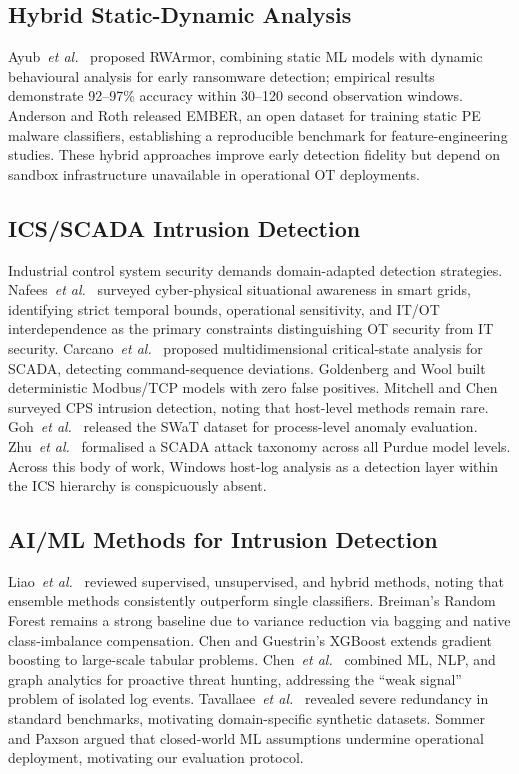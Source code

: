 \subsection{Hybrid Static-Dynamic Analysis}

Ayub~\textit{et al.}\ \cite{ayub2023} proposed RWArmor, combining static ML models with
dynamic behavioural analysis for early ransomware detection; empirical results demonstrate
92--97\% accuracy within 30--120 second observation windows. Anderson and Roth
\cite{anderson2018} released EMBER, an open dataset for training static PE malware
classifiers, establishing a reproducible benchmark for feature-engineering studies. These
hybrid approaches improve early detection fidelity but depend on sandbox infrastructure
unavailable in operational OT deployments.

\subsection{ICS/SCADA Intrusion Detection}

Industrial control system security demands domain-adapted detection strategies.
Nafees~\textit{et al.}\ \cite{nafees2023} surveyed cyber-physical situational awareness
in smart grids, identifying strict temporal bounds, operational sensitivity, and
IT/OT interdependence as the primary constraints distinguishing OT security from IT
security. Carcano~\textit{et al.}\ \cite{carcano2011scada} proposed multidimensional
critical-state analysis for SCADA, detecting command-sequence deviations. Goldenberg and
Wool \cite{goldenberg2013modbus} built deterministic Modbus/TCP models with zero false
positives. Mitchell and Chen \cite{mitchell2014survey} surveyed CPS intrusion detection,
noting that host-level methods remain rare. Goh~\textit{et al.}\ \cite{goh2016swat}
released the SWaT dataset for process-level anomaly evaluation. Zhu~\textit{et al.}\
\cite{zhu2011scada} formalised a SCADA attack taxonomy across all Purdue model levels.
Across this body of work, Windows host-log analysis as a detection layer within the ICS
hierarchy is conspicuously absent.

\subsection{AI/ML Methods for Intrusion Detection}

Liao~\textit{et al.}\ \cite{liao2013ids} reviewed supervised, unsupervised, and hybrid
methods, noting that ensemble methods consistently outperform single classifiers.
Breiman's Random Forest \cite{breiman2001} remains a strong baseline due to variance
reduction via bagging and native class-imbalance compensation. Chen and Guestrin's
XGBoost \cite{chen2016xgboost} extends gradient boosting to large-scale tabular problems.
Chen~\textit{et al.}\ \cite{chen2022} combined ML, NLP, and graph analytics for
proactive threat hunting, addressing the ``weak signal'' problem of isolated log events.
Tavallaee~\textit{et al.}\ \cite{tavallaee2009kdd} revealed severe redundancy in
standard benchmarks, motivating domain-specific synthetic datasets. Sommer and Paxson
\cite{sommer2010outside} argued that closed-world ML assumptions undermine operational
deployment, motivating our evaluation protocol.

